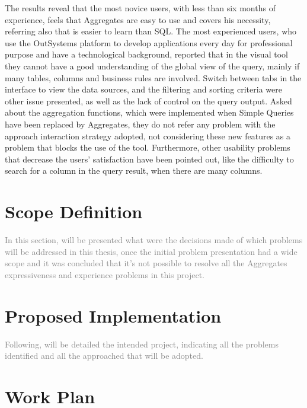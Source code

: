 The results reveal that the most novice users, with less than six months of experience, feels that Aggregates are easy to use and covers his necessity, referring also that is easier to learn than SQL. The most experienced users, who use the OutSystems platform to develop applications every day for professional purpose and have a technological background, reported that in the visual tool they cannot have a good understanding of the global view of the query, mainly if many tables, columns and business rules are involved. Switch between tabs in the interface to view the data sources, and the filtering and sorting criteria were other issue presented, as well as the lack of control on the query output. Asked about the aggregation functions, which were implemented when Simple Queries have been replaced by Aggregates, they do not refer any problem with the approach interaction strategy adopted, not considering these new features as a problem that blocks the use of the tool. Furthermore, other usability problems that decrease the users’ satisfaction have been pointed out, like the difficulty to search for a column in the query result, when there are many columns.



\section{Scope Definition}
\label{sec:scope_definition}
\textcolor{gray}{In this section, will be presented what were the decisions made of which problems will be addressed in this thesis, once the initial problem presentation had a wide scope and it was concluded that it's not possible to resolve all the Aggregates expressiveness and experience problems in this project.}

\section{Proposed Implementation}
\label{sec:proposed_implementation}
\textcolor{gray}{Following, will be detailed the intended project, indicating all the problems identified and all the approached that will be adopted.}

\section{Work Plan}
\label{sec:work_plan}

